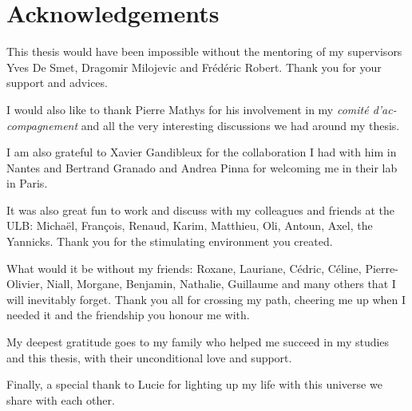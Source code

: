\chapter{Acknowledgements}

This thesis would have been impossible without the mentoring of my supervisors Yves De Smet, Dragomir Milojevic and Frédéric Robert. Thank you for your support and advices.

I would also like to thank Pierre Mathys for his involvement in my \textit{comité d'ac-compagnement} and all the very interesting discussions we had around my thesis.

I am also grateful to Xavier Gandibleux for the collaboration I had with him in Nantes and Bertrand Granado and Andrea Pinna for welcoming me in their lab in Paris.

It was also great fun to work and discuss with my colleagues and friends at the ULB: Michaël, François, Renaud, Karim, Matthieu, Oli, Antoun, Axel, the Yannicks. Thank you for the stimulating environment you created.

What would it be without my friends: Roxane, Lauriane, Cédric, Céline, Pierre-Olivier, Niall, Morgane, Benjamin, Nathalie, Guillaume and many others that I will inevitably forget. Thank you all for crossing my path, cheering me up when I needed it and the friendship you honour me with.

My deepest gratitude goes to my family who helped me succeed in my studies and this thesis, with their unconditional love and support.

Finally, a special thank to Lucie for lighting up my life with this universe we share with each other.